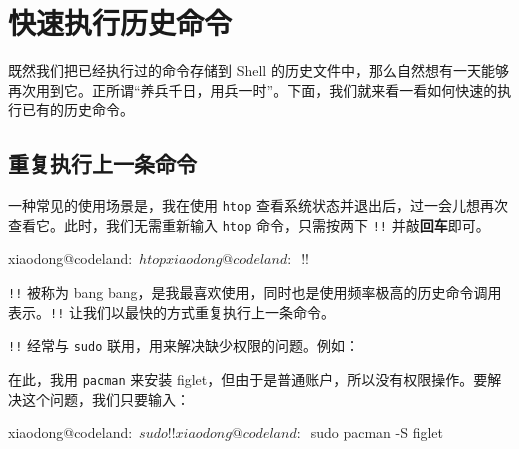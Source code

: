 \documentclass[]{ctexbook}
\newenvironment{Shaded}{\begin{snugshade}}{\end{snugshade}}
\newcommand{\ExtensionTok}[1]{#1}
\newcommand{\NormalTok}[1]{#1}
\begin{document}
\hypertarget{ux5febux901fux6267ux884cux5386ux53f2ux547dux4ee4}{%
\section{快速执行历史命令}\label{ux5febux901fux6267ux884cux5386ux53f2ux547dux4ee4}}

既然我们把已经执行过的命令存储到 Shell 的历史文件中，那么自然想有一天能够再次用到它。正所谓``养兵千日，用兵一时''。下面，我们就来看一看如何快速的执行已有的历史命令。

\hypertarget{ux91cdux590dux6267ux884cux4e0aux4e00ux6761ux547dux4ee4}{%
\subsection{重复执行上一条命令}\label{ux91cdux590dux6267ux884cux4e0aux4e00ux6761ux547dux4ee4}}

一种常见的使用场景是，我在使用 \texttt{htop} 查看系统状态并退出后，过一会儿想再次查看它。此时，我们无需重新输入 \texttt{htop} 命令，只需按两下 \texttt{!!} 并敲\textbf{回车}即可。

\begin{Shaded}
\begin{Highlighting}[]
\ExtensionTok{xiaodong@codeland}\NormalTok{:~$ htop}
\ExtensionTok{xiaodong@codeland}\NormalTok{:~$ !!}
\end{Highlighting}
\end{Shaded}

\texttt{!!} 被称为 bang bang，是我最喜欢使用，同时也是使用频率极高的历史命令调用表示。\texttt{!!} 让我们以最快的方式重复执行上一条命令。

\texttt{!!} 经常与 \texttt{sudo} 联用，用来解决缺少权限的问题。例如：

\begin{Shaded}
\end{Shaded}

在此，我用 \texttt{pacman} 来安装 figlet，但由于是普通账户，所以没有权限操作。要解决这个问题，我们只要输入：

\begin{Shaded}
\begin{Highlighting}[]
\ExtensionTok{xiaodong@codeland}\NormalTok{:~$ sudo !!}
\ExtensionTok{xiaodong@codeland}\NormalTok{:~$ sudo pacman -S figlet}
\end{Highlighting}
\end{Shaded}
\end{document}
